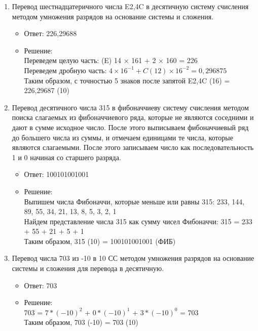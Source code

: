 \documentclass[14pt,final,oneside]{extreport}%
\begin{document}
\begin{enumerate}
        \item Перевод шестнадцатеричного числа E2,4C в десятичную систему счисления методом умножения разрядов на основание системы и сложения.
        \begin{itemize}
            \item Ответ: 226,29688
            \item Решение: \\
                Переведем целую часть: (E) 14 × 161 + 2 × 160 = 226 \\
                Переведем дробную часть: \( 4 \times 16^{-1} + C (12) \times 16^{-2} = 0,296875 \) \\ 
                Таким образом, с точностью 5 знаков после запятой E2,4C (16) = 226,29687 (10)
        \end{itemize}

        \item Перевод десятичного числа 315 в фибоначчиеву систему счисления методом поиска слагаемых из фибоначчиевого ряда, которые не являются соседними и дают в сумме исходное число. После этого выписываем фибоначчиевый ряд до большего числа из суммы, и отмечаем единицами те числа, которые являются слагаемыми. После этого записываем число как последовательность 1 и 0 начиная со старшего разряда.
        \begin{itemize}
            \item Ответ: 100101001001
            \item Решение: \\
                Выпишем числа Фибоначчи, которые меньше или равны 315: 233, 144, 89, 55, 34, 21, 13, 8, 5, 3, 2, 1 \\
                Найдем представление числа 315 как сумму чисел Фибоначчи: 315 = 233 + 55 + 21 + 5 + 1 \\
                Таким образом, 315 (10) = 100101001001 (ФИБ)
        \end{itemize}

        \item Перевод числа 703 из -10 в 10 СС методом умножения разрядов на основание системы и сложения для перевода в десятичную.
        \begin{itemize}
            \item Ответ: 703
            \item Решение: \\
                703 = ${7*(-10)^2}$ + ${0*(-10)^1}$ + ${3*(-10)^0}$ = 703 \\
                Таким образом, 703 (-10) = 703 (10)
        \end{itemize}


\end{enumerate}
\end{document}

